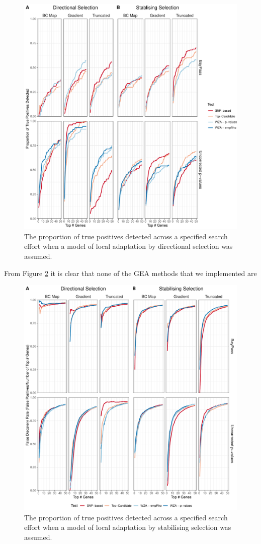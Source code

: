 \documentclass[10pt,twoside,lineno, twocolumn]{GSA_format}
\begin{document}
\begin{figure}
  \includegraphics[width=0.75\linewidth]{Plots/UncorrectedBayPassComparison_TruePositives.pdf} 
  \caption{The proportion of true positives detected across a specified search effort when a model of local adaptation  by directional selection was assumed.}

  \label{fig:truePosDirectional}
\end{figure}

From Figure \ref{fig:falseDiscovery} it is clear that none of the GEA methods that we implemented are 


\begin{figure}
  \includegraphics[width=\linewidth]{Plots/UncorrectedBayPassComparison_FalsePositives.pdf} 
  \caption{The proportion of true positives detected across a specified search effort when a model of local adaptation  by stabilising selection was assumed.}

  \label{fig:falseDiscovery}
\end{figure}
\end{document}
